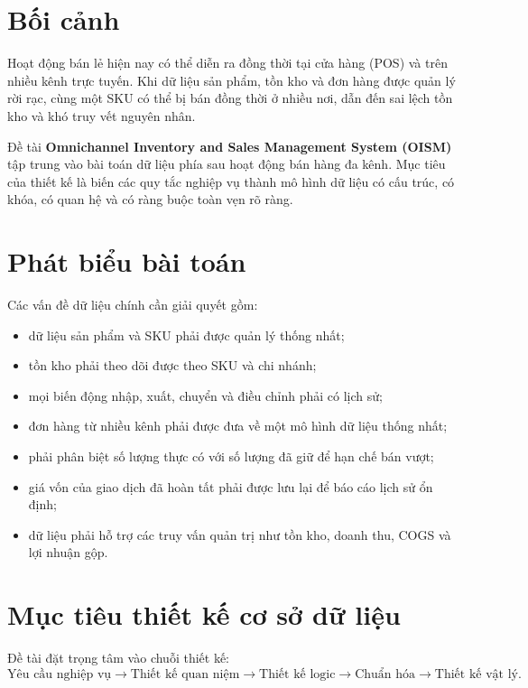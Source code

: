\section{Bối cảnh}

Hoạt động bán lẻ hiện nay có thể diễn ra đồng thời tại cửa hàng (POS) và trên nhiều kênh trực tuyến. Khi dữ liệu sản phẩm, tồn kho và đơn hàng được quản lý rời rạc, cùng một SKU có thể bị bán đồng thời ở nhiều nơi, dẫn đến sai lệch tồn kho và khó truy vết nguyên nhân.

Đề tài \textbf{Omnichannel Inventory and Sales Management System (OISM)} tập trung vào bài toán dữ liệu phía sau hoạt động bán hàng đa kênh. Mục tiêu của thiết kế là biến các quy tắc nghiệp vụ thành mô hình dữ liệu có cấu trúc, có khóa, có quan hệ và có ràng buộc toàn vẹn rõ ràng.

\section{Phát biểu bài toán}

Các vấn đề dữ liệu chính cần giải quyết gồm:
\begin{itemize}
    \item dữ liệu sản phẩm và SKU phải được quản lý thống nhất;
    \item tồn kho phải theo dõi được theo SKU và chi nhánh;
    \item mọi biến động nhập, xuất, chuyển và điều chỉnh phải có lịch sử;
    \item đơn hàng từ nhiều kênh phải được đưa về một mô hình dữ liệu thống nhất;
    \item phải phân biệt số lượng thực có với số lượng đã giữ để hạn chế bán vượt;
    \item giá vốn của giao dịch đã hoàn tất phải được lưu lại để báo cáo lịch sử ổn định;
    \item dữ liệu phải hỗ trợ các truy vấn quản trị như tồn kho, doanh thu, COGS và lợi nhuận gộp.
\end{itemize}

\section{Mục tiêu thiết kế cơ sở dữ liệu}

Đề tài đặt trọng tâm vào chuỗi thiết kế:
\[
\text{Yêu cầu nghiệp vụ} \rightarrow \text{Thiết kế quan niệm} \rightarrow \text{Thiết kế logic} \rightarrow \text{Chuẩn hóa} \rightarrow \text{Thiết kế vật lý}.
\]

